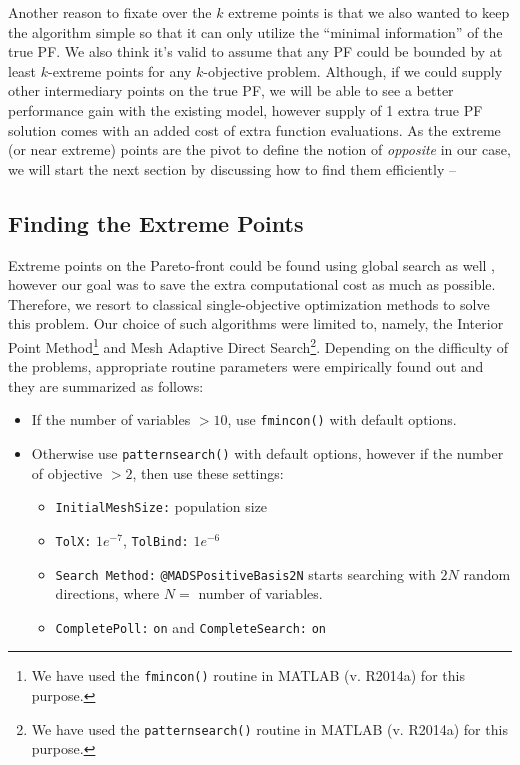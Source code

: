 \documentclass[journal]{IEEEtran}
\begin{document}
Another reason to fixate over the \(k\) extreme points is that we also wanted to keep the algorithm simple so that it can only utilize the ``minimal information'' of the true PF. We also think it's valid to assume that any PF could be bounded by at least \(k\)-extreme points for any \(k\)-objective problem. Although, if we could supply other intermediary points on the true PF, we will be able to see a better performance gain with the existing model, however supply of 1 extra true PF solution comes with an added cost of extra function evaluations. As the extreme (or near extreme) points are the pivot to define the notion of \textit{opposite} in our case, we will start the next section by discussing how to find them efficiently --

\subsection{Finding the Extreme Points}
Extreme points on the Pareto-front could be found using global search as well \cite{}, however our goal was to save the extra computational cost as much as possible. Therefore, we resort to classical single-objective optimization methods to solve this problem. Our choice of such algorithms were limited to, namely, the Interior Point Method\footnote{We have used the \texttt{fmincon()} routine in MATLAB (v. R2014a) for this purpose.} and Mesh Adaptive Direct Search\footnote{We have used the \texttt{patternsearch()} routine in MATLAB (v. R2014a) for this purpose.}. Depending on the difficulty of the problems, appropriate routine parameters were empirically found out and they are summarized as follows: 
%
\begin{itemize}
	\item If the number of variables $> 10$, use \texttt{fmincon()} with default options.
	\item Otherwise use \texttt{patternsearch()} with default options, however if the number of objective $> 2$, then use these settings:
		\begin{itemize}
			\item \texttt{InitialMeshSize:} population size
			\item \texttt{TolX:} $1e^{-7}$, \texttt{TolBind:} $1e^{-6}$
			\item \texttt{Search Method:} \texttt{@MADSPositiveBasis2N} starts searching with $2N$ random directions, where $N =$ number of variables.
			\item \texttt{CompletePoll:} \texttt{on} and \texttt{CompleteSearch:} \texttt{on}
		\end{itemize}
\end{itemize}
\end{document}
